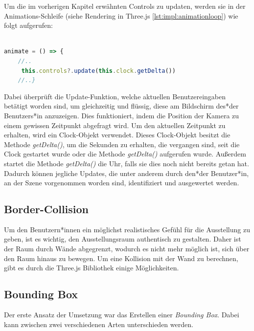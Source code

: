 Um die im vorherigen Kapitel erwähnten Controls zu updaten, werden sie in der Animations-Schleife (siehe Rendering in Three.js \ref{lst:impl:animationloop}) wie folgt aufgerufen: 

\begin{lstlisting}[caption={Controls updaten},language=TypeScript]
    
animate = () => {
    //..
     this.controls?.update(this.clock.getDelta())
    //..}

    \end{lstlisting}

Dabei überprüft die Update-Funktion, welche aktuellen Benutzereingaben betätigt worden sind, um gleichzeitig und flüssig, diese am Bildschirm des*der Benutzers*in anzuzeigen. Dies funktioniert, indem die Position der Kamera zu einem gewissen Zeitpunkt abgefragt wird. Um den aktuellen Zeitpunkt zu erhalten, wird ein Clock-Objekt verwendet. Dieses Clock-Objekt besitzt die Methode \emph{getDelta()}, um die Sekunden zu erhalten, die vergangen sind, seit die Clock gestartet wurde oder die Methode \emph{getDelta()} aufgerufen wurde. Außerdem startet die Methode \emph{getDelta()} die Uhr, falls sie dies noch nicht bereits getan hat. Dadurch können jegliche Updates, die unter anderem durch den*der Benutzer*in, an der Szene vorgenommen worden sind, identifiziert und ausgewertet werden. \cite{ThreeJsClock}

\subsection{Border-Collision}
Um den Benutzern*innen ein möglichst realistisches Gefühl für die Ausstellung zu geben, ist es wichtig, den Ausstellungsraum authentisch zu gestalten. Daher ist der Raum durch Wände abgegrenzt, wodurch es nicht mehr möglich ist, sich über den Raum hinaus zu bewegen. Um eine Kollision mit der Wand zu berechnen, gibt es durch die Three.js Bibliothek einige Möglichkeiten.


\subsection{Bounding Box}
Der erste Ansatz der Umsetzung war das Erstellen einer \emph{Bounding Box}. Dabei kann zwischen zwei verschiedenen Arten unterschieden werden. 

